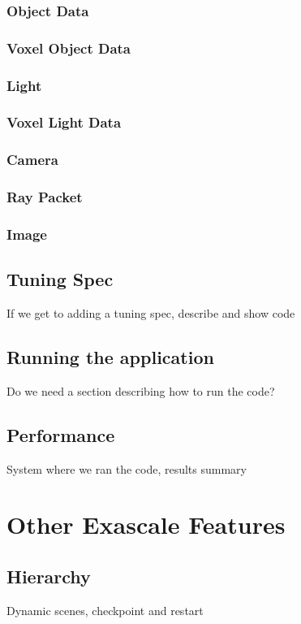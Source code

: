 \documentclass{vgtc}                          %
\begin{document}
\subsubsection{Object Data}
\subsubsection{Voxel Object Data}
\subsubsection{Light}
\subsubsection{Voxel Light Data}
\subsubsection{Camera}
\subsubsection{Ray Packet}
\subsubsection{Image}

\subsection{Tuning Spec}
If we get to adding a tuning spec, describe and show code

\subsection{Running the application}
Do we need a section describing how to run the code?

\subsection{Performance}
System where we ran the code, results summary \\

\section{Other Exascale Features}
\subsection{Hierarchy}
Dynamic scenes, checkpoint and restart \\
\end{document}
